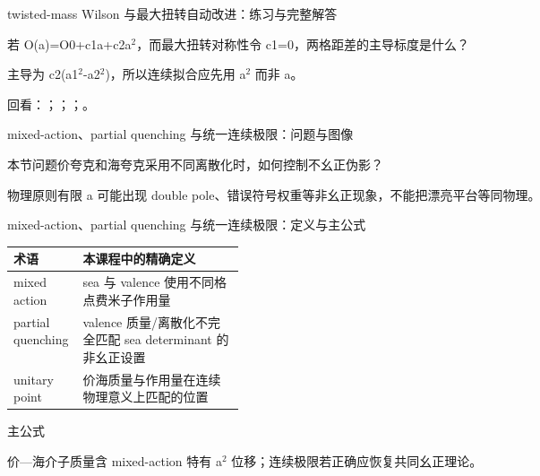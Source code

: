 \begin{frame}[t]{twisted-mass Wilson 与最大扭转自动改进：练习与完整解答}
\footnotesize
\begin{block}{}若 O(a)=O0+c1a+c2a\ensuremath{^{2}}，而最大扭转对称性令 c1=0，两格距差的主导标度是什么？\end{block}
\begin{exampleblock}{}主导为 c2(a1\ensuremath{^{2}}-a2\ensuremath{^{2}})，所以连续拟合应先用 a\ensuremath{^{2}} 而非 a。\end{exampleblock}
\vfill
\scriptsize 回看：；；；。
\end{frame}

\begin{frame}[t]{mixed-action、partial quenching 与统一连续极限：问题与图像}
\footnotesize
\begin{block}{本节问题}价夸克和海夸克采用不同离散化时，如何控制不幺正伪影？\end{block}
\begin{block}{物理原则}\quad 有限 a 可能出现 double pole、错误符号权重等非幺正现象，不能把漂亮平台等同物理。\end{block}
\end{frame}

\begin{frame}[t]{mixed-action、partial quenching 与统一连续极限：定义与主公式}
\footnotesize\begin{tabularx}{\linewidth}{p{0.30\linewidth}Y}
\toprule 术语 & 本课程中的精确定义\\\midrule
{} mixed action & sea 与 valence 使用不同格点费米子作用量\\
 partial quenching & valence 质量/\allowbreak{}离散化不完全匹配 sea determinant 的非幺正设置\\
 unitary point & 价海质量与作用量在连续物理意义上匹配的位置\\
\bottomrule\end{tabularx}\vspace{0.15cm}
\begin{block}{ 主公式}\centering{}\end{block}
价—海介子质量含 mixed-action 特有 a\ensuremath{^{2}} 位移；连续极限若正确应恢复共同幺正理论。
\end{frame}

